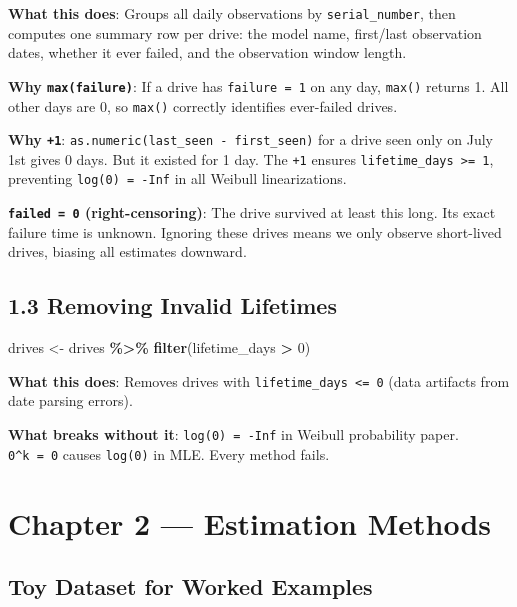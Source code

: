 \documentclass[
]{article}
\newenvironment{Shaded}{\begin{snugshade}}{\end{snugshade}}
\newcommand{\DecValTok}[1]{\textcolor[rgb]{0.00,0.00,0.81}{#1}}
\newcommand{\FunctionTok}[1]{\textcolor[rgb]{0.13,0.29,0.53}{\textbf{#1}}}
\newcommand{\NormalTok}[1]{#1}
\newcommand{\OtherTok}[1]{\textcolor[rgb]{0.56,0.35,0.01}{#1}}
\newcommand{\SpecialCharTok}[1]{\textcolor[rgb]{0.81,0.36,0.00}{\textbf{#1}}}
\begin{document}
\textbf{What this does}: Groups all daily observations by
\texttt{serial\_number}, then computes one summary row per drive: the
model name, first/last observation dates, whether it ever failed, and
the observation window length.

\textbf{Why \texttt{max(failure)}}: If a drive has
\texttt{failure\ =\ 1} on any day, \texttt{max()} returns 1. All other
days are 0, so \texttt{max()} correctly identifies ever-failed drives.

\textbf{Why \texttt{+1}}:
\texttt{as.numeric(last\_seen\ -\ first\_seen)} for a drive seen only on
July 1st gives 0 days. But it existed for 1 day. The \texttt{+1} ensures
\texttt{lifetime\_days\ \textgreater{}=\ 1}, preventing
\texttt{log(0)\ =\ -Inf} in all Weibull linearizations.

\textbf{\texttt{failed\ =\ 0} (right-censoring)}: The drive survived at
least this long. Its exact failure time is unknown. Ignoring these
drives means we only observe short-lived drives, biasing all estimates
downward.

\subsection{1.3 Removing Invalid
Lifetimes}\label{removing-invalid-lifetimes}

\begin{Shaded}
\begin{Highlighting}[]
\NormalTok{drives }\OtherTok{\textless{}{-}}\NormalTok{ drives }\SpecialCharTok{\%\textgreater{}\%} \FunctionTok{filter}\NormalTok{(lifetime\_days }\SpecialCharTok{\textgreater{}} \DecValTok{0}\NormalTok{)}
\end{Highlighting}
\end{Shaded}

\textbf{What this does}: Removes drives with
\texttt{lifetime\_days\ \textless{}=\ 0} (data artifacts from date
parsing errors).

\textbf{What breaks without it}: \texttt{log(0)\ =\ -Inf} in Weibull
probability paper. \texttt{0\^{}k\ =\ 0} causes \texttt{log(0)} in MLE.
Every method fails.

\newpage

\section{Chapter 2 --- Estimation
Methods}\label{chapter-2-estimation-methods}

\subsection{Toy Dataset for Worked
Examples}\label{toy-dataset-for-worked-examples}
\end{document}
